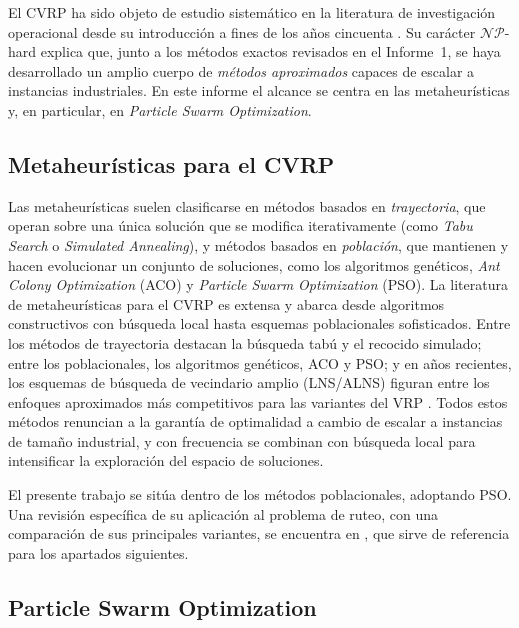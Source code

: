El CVRP ha sido objeto de estudio sistemático en la literatura de investigación
operacional desde su introducción a fines de los años cincuenta
\parencite{dantzig1959truck}. Su carácter $\mathcal{NP}$-hard
\parencite{lenstra1981complexity} explica que, junto a los métodos exactos revisados en
el Informe~1, se haya desarrollado un amplio cuerpo de \textit{métodos aproximados}
capaces de escalar a instancias industriales. En este informe el alcance se centra en
las metaheurísticas y, en particular, en \textit{Particle Swarm Optimization}.

\subsection{Metaheurísticas para el CVRP}

Las metaheurísticas suelen clasificarse en métodos basados en \textit{trayectoria}, que
operan sobre una única solución que se modifica iterativamente (como \textit{Tabu
Search} o \textit{Simulated Annealing}), y métodos basados en \textit{población}, que
mantienen y hacen evolucionar un conjunto de soluciones, como los algoritmos genéticos,
\textit{Ant Colony Optimization} (ACO) y \textit{Particle Swarm Optimization} (PSO).
La literatura de metaheurísticas para el CVRP es extensa y abarca desde algoritmos
constructivos con búsqueda local hasta esquemas poblacionales sofisticados. Entre los
métodos de trayectoria destacan la búsqueda tabú y el recocido simulado; entre los
poblacionales, los algoritmos genéticos, ACO y PSO; y en años recientes, los esquemas de
búsqueda de vecindario amplio (LNS/ALNS) figuran entre los enfoques aproximados más
competitivos para las variantes del VRP \parencite{tan2021vehicle}. Todos estos métodos
renuncian a la garantía de optimalidad a cambio de escalar a instancias de tamaño
industrial, y con frecuencia se combinan con búsqueda local para intensificar la
exploración del espacio de soluciones.

El presente trabajo se sitúa dentro de los métodos poblacionales, adoptando PSO. Una
revisión específica de su aplicación al problema de ruteo, con una comparación de sus
principales variantes, se encuentra en \textcite{marinakis2018particle}, que sirve de
referencia para los apartados siguientes.

\subsection{Particle Swarm Optimization}

